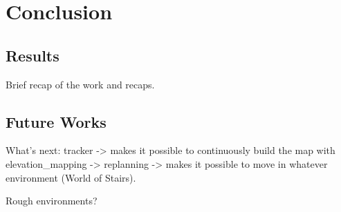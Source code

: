 \chapter{Conclusion}
\label{ch:conclusion}
\section{Results}
Brief recap of the work and recaps.

\section{Future Works}
What's next: tracker -> makes it possible to continuously build the map with 
elevation\_mapping -> replanning -> makes it possible to move in whatever 
environment (World of Stairs).

Rough environments?

